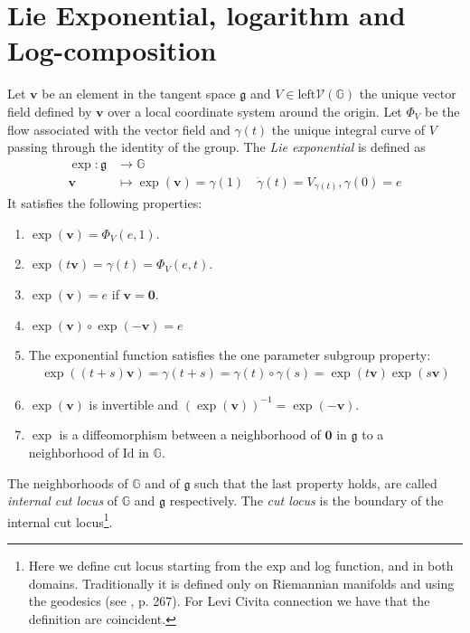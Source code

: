\section{Lie Exponential, logarithm and Log-composition}\label{se:lie_exp_log_comp}
Let $\mathbf{v}$ be an element in the tangent space $\mathfrak{g}$ and $V\in\text{left}\mathcal{V}(\mathbb{G})$ the unique vector field defined by $\mathbf{v}$ over a local coordinate system around the origin. Let $\Phi_{V}$ be the flow associated with the vector field and $\gamma(t)$ the unique integral curve of $V$ passing through the identity of the group.  
The \emph{Lie exponential} is defined as
\begin{align*}
\exp :  \mathfrak{g} & \longrightarrow  \mathbb{G}  \\
\mathbf{v} &\longmapsto  \exp(\mathbf{v} ) = \gamma(1) \quad \dot{\gamma}(t) = V_{\gamma(t)}, \gamma(0) = e
\end{align*}
It satisfies the following properties:
\begin{enumerate}
	    \item $\exp(\mathbf{v}) = \Phi_{V}(e,1)$.
	    \item $\exp(t\mathbf{v}) =\gamma(t) = \Phi_{V}(e,t)$.
   	 	\item $\exp(\mathbf{v}) = e$ if $\mathbf{v} = \mathbf{0}$.
   	 	\item $\exp(\mathbf{v})\circ \exp(\mathbf{-v})  = e$
	 	\item The exponential function satisfies the one parameter subgroup property:
	 	\begin{align*}
        \exp((t+s)\mathbf{v}) = \gamma(t+s) = \gamma(t)\circ \gamma(s) = \exp(t\mathbf{v})\exp(s\mathbf{v})
	 	\end{align*}
	 	\item $\exp(\mathbf{v})$ is invertible and $(\exp(\mathbf{v}))^{-1} = \exp(-\mathbf{v})$.
		\item $\exp$ is a diffeomorphism between a neighborhood of $\mathbf{0}$ in $\mathfrak{g}$ to a neighborhood of $\text{Id}$ in $\mathbb{G}$.
\end{enumerate}
The neighborhoods of $\mathbb{G}$ and of $\mathfrak{g}$ such that the last property holds, are called \emph{internal cut locus} of $\mathbb{G}$ and $\mathfrak{g}$ respectively. The \emph{cut locus} is the boundary of the internal cut locus\footnote{Here we define cut locus starting from the exp and log function, and in both domains. Traditionally it is defined only on Riemannian manifolds and using the geodesics (see \cite{do1992riemannian}, p. 267). For Levi Civita connection we have that the definition are coincident.}.\\
